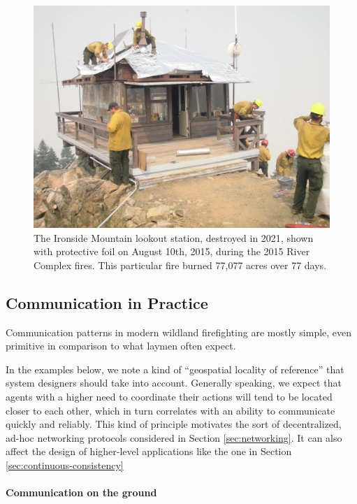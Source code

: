 \documentclass[]             %
{NASA}                       %
\theoremstyle{definition}
\begin{document}
\begin{figure}[h]
\centering
\includegraphics[scale=0.085]{images/ironside.jpg}
\caption{The Ironside Mountain lookout station, destroyed in 2021, shown with protective foil on August 10th, 2015, during the 2015 River Complex fires. This particular fire burned 77,077 acres over 77 days.}
\end{figure}

\subsection{Communication in Practice}\label{communication-in-practice}

Communication patterns in modern wildland firefighting are mostly
simple, even primitive in comparison to what laymen often expect.

In the examples below, we note a kind of ``geospatial locality of
reference'' that system designers should take into account. Generally
speaking, we expect that agents with a higher need to coordinate their
actions will tend to be located closer to each other, which in turn
correlates with an ability to communicate quickly and reliably. This
kind of principle motivates the sort of decentralized, ad-hoc networking
protocols considered in Section \ref{sec:networking}. It can also affect
the design of higher-level applications like the one in Section
\ref{sec:continuous-consistency}

\paragraph{Communication on the ground}
\end{document}
